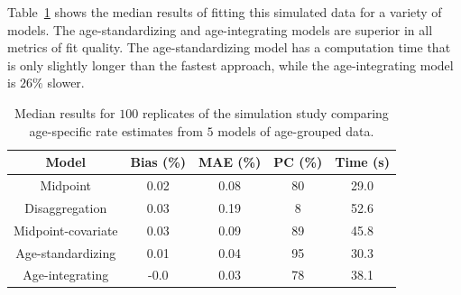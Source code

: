 Table~\ref{age_group_comparison} shows the median results of fitting this simulated data for a variety of models. The age-standardizing and age-integrating models are
superior in all metrics of fit quality.  The age-standardizing
model has a computation time that is only slightly longer than the fastest approach,
while the age-integrating model is $26\%$ slower.

\begin{table}

\caption{Median results for $100$ replicates of the simulation study
  comparing age-specific rate estimates from $5$ models of age-grouped
  data.}
\label{age_group_comparison}

\begin{center}
\begin{tabular}{|c|c|c|c|c|}
\hline
Model&Bias (\%)&MAE (\%)&PC (\%)&Time (s)\\
\hline
Midpoint&0.02&0.08          &80&29.0\\
Disaggregation&0.03&0.19    &8 &52.6\\
Midpoint-covariate&0.03 &0.09&89&45.8\\
Age-standardizing&0.01&0.04 &95&30.3\\
Age-integrating&-0.0&0.03   &78&38.1\\
\hline
\end{tabular}
\end{center}
\end{table}
